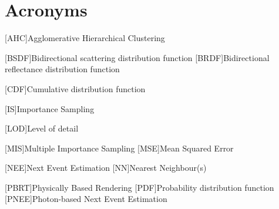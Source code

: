 \newpage
\section*{Acronyms}

\begin{acronym}[ECU]


[AHC]{Agglomerative Hierarchical Clustering}


[BSDF]{Bidirectional scattering distribution function}
[BRDF]{Bidirectional reflectance distribution function}

[CDF]{Cumulative distribution function}

[IS]{Importance Sampling}

[LOD]{Level of detail}

[MIS]{Multiple Importance Sampling}
[MSE]{Mean Squared Error}

[NEE]{Next Event Estimation}
[NN]{Nearest Neighbour(s)}

[PBRT]{Physically Based Rendering}
[PDF]{Probability distribution function}
[PNEE]{Photon-based Next Event Estimation}


\end{acronym}
